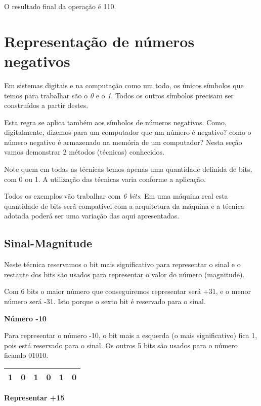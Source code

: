 O resultado final da operação é 110.


\section{Representação de números negativos}
\label{numerosNegativos}

Em sistemas digitais e na computação como um todo, os únicos símbolos que temos para trabalhar são o \emph{0} e o \emph{1}. Todos os outros símbolos precisam ser construídos a partir destes. 

Esta regra se aplica também aos símbolos de números negativos. Como, digitalmente, dizemos para um computador que um número é negativo? como o número negativo é armazenado na memória de um computador? Nesta seção vamos demonstrar 2 métodos (técnicas) conhecidos.

Note quem em todas as técnicas temos apenas uma quantidade definida de bits, com 0 ou 1. A utilização das técnicas varia conforme a aplicação.

Todos os exemplos vão trabalhar com \emph{6 bits}. Em uma máquina real esta quantidade de bits será compatível com a arquitetura da máquina e a técnica adotada poderá ser uma variação das aqui apresentadas.

\subsection{Sinal-Magnitude}
\label{sinalMagnitude}
Neste técnica reservamos o bit mais significativo para representar o sinal e o restante dos bits são usados para representar o valor do número (magnitude).

Com 6 bits o maior número que conseguiremos representar será +31, e o menor número será -31. Isto porque o sexto bit é reservado para o sinal.

\noindent\textbf{Número  -10}

Para representar o número -10, o bit mais a esquerda (o mais significativo) fica 1, pois está reservado para o sinal. Os outros 5 bits são usados para o número ficando 01010.

\begin{table}[h]
	\centering
	\begin{tabular}{|r|r|r|r|r|r|}
		\hline
		1 & 0 & 1  & 0 &  1 & 0 \\
		\hline
	\end{tabular}
\end{table}


\noindent\textbf{Representar +15}


